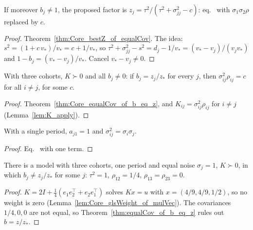 \begin{theorem}\label{thm:bestZ_of_equalCov}
  \leanok
  If moreover $b_j \ne 1$, the proposed factor is
  $z_j = \tau^2/(\tau^2 + \sigma_{jj}^2 - c)$: eq.~ with
  $\sigma_1\sigma_2\rho$ replaced by $c$.
\end{theorem}
\begin{proof}
  \leanok
  Theorem~\ref{thm:Core_bestZ_of_equalCov}. The idea:
  $s^2 = (1 + c\,v_*)/v_* = c + 1/v_*$, so
  $\tau^2 + \sigma_{jj}^2 - s^2 = d_j - 1/v_* = (v_* - v_j)/(v_j v_*)$ and
  $1 - b_j = (v_* - v_j)/v_*$. Cancel $v_* - v_j \ne 0$.
\end{proof}

\begin{theorem}\label{thm:equalCov_of_b_eq_z}
  \leanok
  With three cohorts, $K \succ 0$ and all $b_j \ne 0$: if $b_j = z_j/z_*$ for every
  $j$, then $\sigma^2_{ij}\rho_{ij} = c$ for all $i \ne j$, for some $c$.
\end{theorem}
\begin{proof}
  \leanok
  Theorem~\ref{thm:Core_equalCov_of_b_eq_z}, and $K_{ij} = \sigma^2_{ij}\rho_{ij}$
  for $i \ne j$ (Lemma~\ref{lem:K_apply}).
\end{proof}

\begin{lemma}\label{lem:sigma2_of_unique}
  \leanok
  With a single period, $a_{j1} = 1$ and $\sigma^2_{ij} = \sigma_i\sigma_j$.
\end{lemma}
\begin{proof}
  \leanok
  Eq.~ with one term.
\end{proof}

\begin{theorem}[Finding 4: three cohorts break $b = z/z_*$]\label{thm:exists_b_ne_z}
  \leanok
  There is a model with three cohorts, one period and equal noise $\sigma_j = 1$,
  $K \succ 0$, in which $b_j \ne z_j/z_*$ for some $j$: $\tau^2 = 1$,
  $\rho_{12} = 1/4$, $\rho_{13} = \rho_{23} = 0$.
\end{theorem}
\begin{proof}
  \leanok
  $K = 2I + \tfrac14(e_1e_2^\top + e_2e_1^\top)$ solves $Kx = u$ with
  $x = (4/9, 4/9, 1/2)$, so no weight is zero
  (Lemma~\ref{lem:Core_glsWeight_of_mulVec}). The covariances $1/4, 0, 0$ are not
  equal, so Theorem~\ref{thm:equalCov_of_b_eq_z} rules out $b = z/z_*$.
\end{proof}

